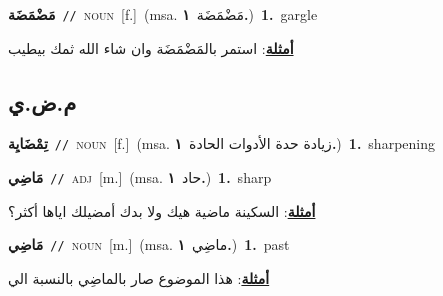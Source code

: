 \documentclass[10pt,a4paper,twoside]{article} %
\begin{document}
\begin{multicols}{2}
{\setlength\topsep{0pt}\textbf{\foreignlanguage{arabic}{مَضْمَضَة}}\ {\color{gray}\texttt{//}\color{black}}\ \textsc{noun}\ [f.]\ \color{gray}(msa. \foreignlanguage{arabic}{مَضْمَضَة}~\foreignlanguage{arabic}{\textbf{١.}})\color{black}\ \textbf{1.}~gargle\  \begin{flushright}\color{gray}\foreignlanguage{arabic}{\textbf{\underline{\foreignlanguage{arabic}{أمثلة}}}: استمر بالمَضْمَضَة وان شاء الله ثمك بيطيب}\end{flushright}\color{black}} \vspace{2mm}

\vspace{-3mm}
\subsection*{\color{blue}\foreignlanguage{arabic}{م.ض.ي}\color{blue}{}} 

{\setlength\topsep{0pt}\textbf{\foreignlanguage{arabic}{تِمْضَايِة}}\ {\color{gray}\texttt{//}\color{black}}\ \textsc{noun}\ [f.]\ \color{gray}(msa. \foreignlanguage{arabic}{زيادة حدة الأدوات الحادة}~\foreignlanguage{arabic}{\textbf{١.}})\color{black}\ \textbf{1.}~sharpening\ } \vspace{2mm}

{\setlength\topsep{0pt}\textbf{\foreignlanguage{arabic}{مَاضِي}}\ {\color{gray}\texttt{//}\color{black}}\ \textsc{adj}\ [m.]\ \color{gray}(msa. \foreignlanguage{arabic}{حاد}~\foreignlanguage{arabic}{\textbf{١.}})\color{black}\ \textbf{1.}~sharp\  \begin{flushright}\color{gray}\foreignlanguage{arabic}{\textbf{\underline{\foreignlanguage{arabic}{أمثلة}}}: السكينة ماضية هيك ولا بدك أمضيلك اياها أكثر؟}\end{flushright}\color{black}} \vspace{2mm}

{\setlength\topsep{0pt}\textbf{\foreignlanguage{arabic}{مَاضِي}}\ {\color{gray}\texttt{//}\color{black}}\ \textsc{noun}\ [m.]\ \color{gray}(msa. \foreignlanguage{arabic}{ماضِي}~\foreignlanguage{arabic}{\textbf{١.}})\color{black}\ \textbf{1.}~past\  \begin{flushright}\color{gray}\foreignlanguage{arabic}{\textbf{\underline{\foreignlanguage{arabic}{أمثلة}}}: هذا الموضوع صار بالماضِي بالنسبة الي}\end{flushright}\color{black}} \vspace{2mm}


\end{multicols}
\end{document}
